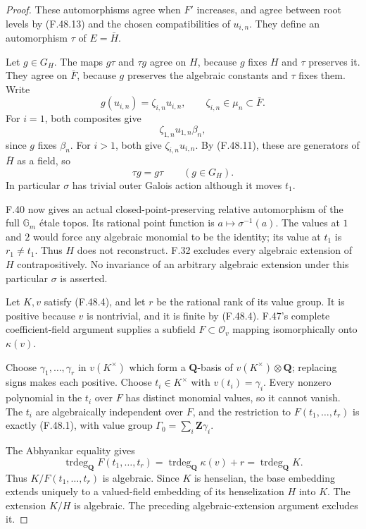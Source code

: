 \begin{proof}
These automorphisms agree when \(F'\) increases, and agree between root levels by (F.48.13) and the chosen compatibilities of \(u_{i,n}\). They define an automorphism \(\tau\) of \(E=\bar H\).

Let \(g\in G_H\). The maps \(g\tau\) and \(\tau g\) agree on \(H\), because \(g\) fixes \(H\) and \(\tau\) preserves it. They agree on \(\bar F\), because \(g\) preserves the algebraic constants and \(\tau\) fixes them. Write
\[
                  g(u_{i,n})=\zeta_{i,n}u_{i,n},
                    \qquad \zeta_{i,n}\in\mu_n\subset\bar F.
\]
For \(i=1\), both composites give
\[
                       \zeta_{1,n}u_{1,n}\beta_n,
\]
since \(g\) fixes \(\beta_n\). For \(i>1\), both give \(\zeta_{i,n}u_{i,n}\). By (F.48.11), these are generators of \(\bar H\) as a field, so
\[
                 \tau g=g\tau\qquad(g\in G_H).
 \tag{F.48.15}
\]
In particular \(\sigma\) has trivial outer Galois action although it moves \(t_1\).

F.40 now gives an actual closed-point-preserving relative automorphism of the full \(\mathbb G_m\) étale topos. Its rational point function is \(a\mapsto\sigma^{-1}(a)\). The values at \(1\) and \(2\) would force any algebraic monomial to be the identity; its value at \(t_1\) is \(r_1\ne t_1\). Thus \(H\) does not reconstruct. F.32 excludes every algebraic extension of \(H\) contrapositively. No invariance of an arbitrary algebraic extension under this particular \(\sigma\) is asserted.

Let \(K,v\) satisfy (F.48.4), and let \(r\) be the rational rank of its value group. It is positive because \(v\) is nontrivial, and it is finite by (F.48.4). F.47's complete coefficient-field argument \citep[Proposition~3.3.8]{F_ADH2017} supplies a subfield \(F\subset\mathcal O_v\) mapping isomorphically onto \(\kappa(v)\).

Choose \(\gamma_1,\ldots,\gamma_r\) in \(v(K^\times)\) which form a \(\mathbf Q\)-basis of \(v(K^\times)\otimes\mathbf Q\); replacing signs makes each positive. Choose \(t_i\in K^\times\) with \(v(t_i)=\gamma_i\). Every nonzero polynomial in the \(t_i\) over \(F\) has distinct monomial values, so it cannot vanish. The \(t_i\) are algebraically independent over \(F\), and the restriction to \(F(t_1,\ldots,t_r)\) is exactly (F.48.1), with value group \(\Gamma_0=\sum_i\mathbf Z\gamma_i\).

The Abhyankar equality gives
\[
 \operatorname{trdeg}_{\mathbf Q}F(t_1,\ldots,t_r)
       =\operatorname{trdeg}_{\mathbf Q}\kappa(v)+r
       =\operatorname{trdeg}_{\mathbf Q}K.
\]
Thus \(K/F(t_1,\ldots,t_r)\) is algebraic. Since \(K\) is henselian, the base embedding extends uniquely to a valued-field embedding of its henselization \(H\) into \(K\). The extension \(K/H\) is algebraic. The preceding algebraic-extension argument excludes it.


\end{proof}
